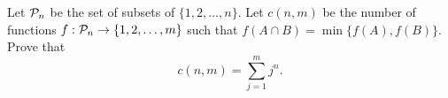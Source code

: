 Let ${\cal P}_n$ be the set of subsets of $\{1, 2, \dots, n\}$.
Let $c(n, m)$ be the number of functions $f: {\cal P}_n \to \{1, 2, \dots, m\}$ such that $f(A \cap B) = \min\{f(A), f(B)\}$.
Prove that \[ c(n, m) = \sum_{j=1}^m j^n. \]
